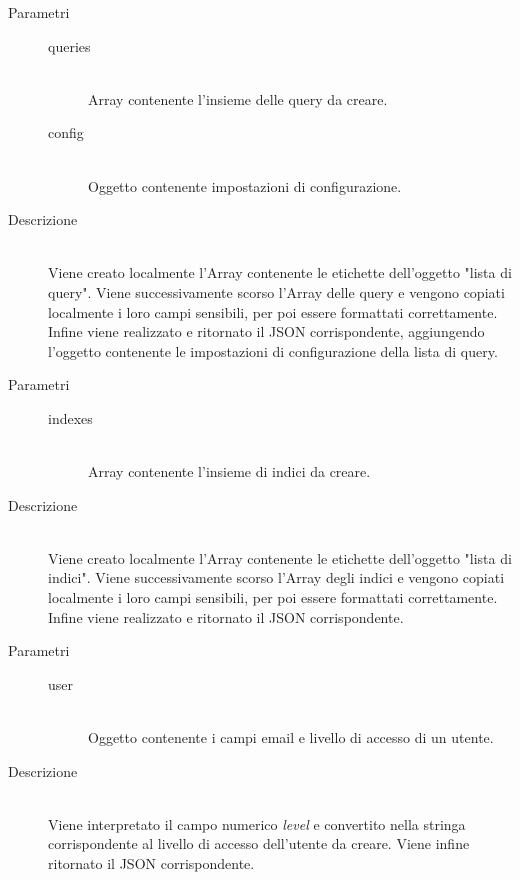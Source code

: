 \begin{description}
\begin{mldescription}
    \hfill
   \begin{description}
    \item[Parametri]
     \begin{description}
      \item[queries] \hfill \\
      Array contenente l'insieme delle query da creare.
      \item[config] \hfill \\
      Oggetto contenente impostazioni di configurazione.
     \end{description}
    \item[Descrizione] \hfill \\
    Viene creato localmente l'Array contenente le etichette dell'oggetto "lista di query". Viene successivamente scorso l'Array delle query e vengono copiati localmente i loro campi sensibili, per poi essere formattati correttamente. Infine viene realizzato e ritornato il JSON corrispondente, aggiungendo l'oggetto contenente le impostazioni di configurazione della lista di query.
   \end{description}
   
    \hfill
   \begin{description}
    \item[Parametri]
     \begin{description}
      \item[indexes] \hfill \\
      Array contenente l'insieme di indici da creare.
     \end{description}
    \item[Descrizione] \hfill \\
    Viene creato localmente l'Array contenente le etichette dell'oggetto "lista di indici". Viene successivamente scorso l'Array degli indici e vengono copiati localmente i loro campi sensibili, per poi essere formattati correttamente. Infine viene realizzato e ritornato il JSON corrispondente.
   \end{description}
   
    \hfill
   \begin{description}
    \item[Parametri]
     \begin{description}
      \item[user] \hfill \\
      Oggetto contenente i campi email e livello di accesso di un utente.
     \end{description}
    \item[Descrizione] \hfill \\
    Viene interpretato il campo numerico \textit{level} e convertito nella stringa corrispondente al livello di accesso dell'utente da creare. Viene infine ritornato il JSON corrispondente.
   \end{description}
   

\end{mldescription}
\end{description}

